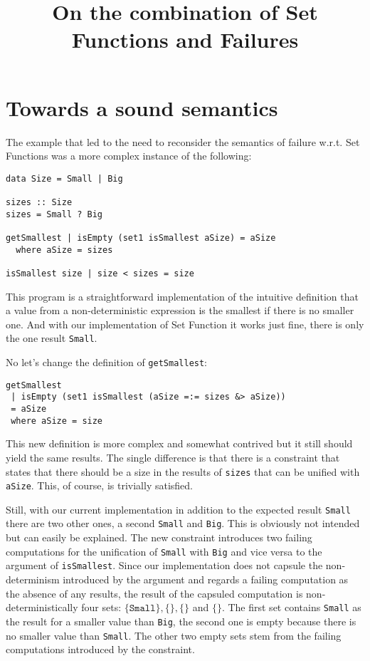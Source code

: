 \documentclass{article}
\title{On the combination of Set Functions and Failures}
\begin{document}
\maketitle

\section{Towards a sound semantics}

The example that led to the need to reconsider the semantics of failure w.r.t.
Set Functions was a more complex instance of the following:

\begin{lstlisting}
data Size = Small | Big

sizes :: Size
sizes = Small ? Big

getSmallest | isEmpty (set1 isSmallest aSize) = aSize
  where aSize = sizes

isSmallest size | size < sizes = size
\end{lstlisting}

This program is a straightforward implementation of the intuitive definition
that a value from a non-deterministic expression is the smallest if there
is no smaller one. And with our implementation of Set Function it works
just fine, there is only the one result \lstinline{Small}.

No let's change the definition of \lstinline{getSmallest}:

\begin{lstlisting}
getSmallest 
 | isEmpty (set1 isSmallest (aSize =:= sizes &> aSize))
 = aSize
 where aSize = size
\end{lstlisting}

This new definition is more complex and somewhat contrived but
it still should yield the same results. The single difference is
that there is a constraint that states that there should be a
size in the results of \lstinline{sizes} that can be unified
with \lstinline{aSize}. This, of course, is trivially satisfied.

Still, with our current implementation in addition to the expected
result \lstinline{Small} there are two other ones, a second
\lstinline{Small} and \lstinline{Big}. This is obviously not intended
but can easily be explained. The new constraint introduces two
failing computations for the unification of \lstinline{Small} with
\lstinline{Big} and vice versa to the argument of 
\lstinline{isSmallest}. Since our implementation does not
capsule the non-determinism introduced by the argument and regards
a failing computation as the absence of any results, the result
of the capsuled computation is non-deterministically four sets:
$\{\texttt{Small}\},\{\},\{\}$ and $\{\}$. The first set contains
\lstinline{Small} as the result for a smaller value than \lstinline{Big},
the second one is empty because there is no smaller value than \lstinline{Small}.
The other two empty sets stem from the failing computations introduced by
the constraint.
\end{document}
